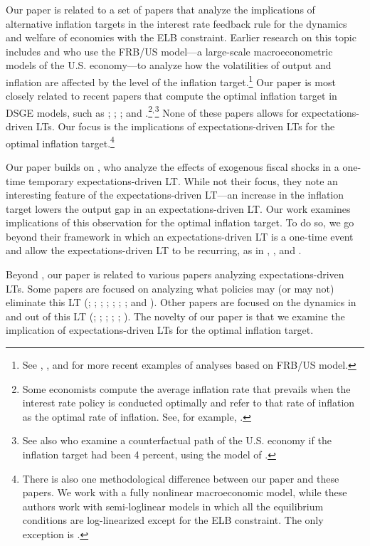 \documentclass[11pt]{article}
\begin{document}
	Our paper is related to a set of papers that analyze the implications of alternative inflation targets in the interest rate feedback rule for the dynamics and welfare of economies with the ELB constraint. Earlier research on this topic includes \citet{ReifschneiderWilliams2000} and \citet{CoenenOrphanidesWieland2004} who use the FRB/US model---a large-scale macroeconometric models of the U.S. economy---to analyze how the volatilities of output and inflation are affected by the level of the inflation target.\footnote{See \citet{Williams2009}, \citet{Tulip2014}, and \citet{KileyRoberts2017} for more recent examples of analyses based on FRB/US model.} Our paper is most closely related to recent papers that compute the optimal inflation target in DSGE models, such as \citet{CoibionGorodnichenkoWieland2012}; \citet{Blanco2018}; \citet{CarrerasCoibionGorodnichenkoWieland2016}; and \citet{AndradeGaliLeBihanMatheron2018}.\footnote{Some economists compute the average inflation rate that prevails when the interest rate policy is conducted optimally and refer to that rate of inflation as the optimal rate of inflation. See, for example, \citet{Billi2011}.}$^{,}$\footnote{See also \citet{AruobaSchorfheide2015} who examine a counterfactual path of the U.S. economy if the inflation target had been 4 percent, using the model of \citet{AruobaCubaBordaSchorfheide2018}.} None of these papers allows for expectations-driven LTs. Our focus is the implications of expectations-driven LTs for the optimal inflation target.\footnote{There is also one methodological difference between our paper and these papers. We work with a fully nonlinear macroeconomic model, while these authors work with semi-loglinear models in which all the equilibrium conditions are log-linearized except for the ELB constraint. The only exception is \citet{Blanco2018}.}

	Our paper builds on \citet{MertensRavn2014}, who analyze the effects of exogenous fiscal shocks in a one-time temporary expectations-driven LT. While not their focus, they note an interesting feature of the expectations-driven LT---an increase in the inflation target lowers the output gap in an expectations-driven LT. Our work examines implications of this observation for the optimal inflation target. To do so, we go beyond their framework in which an expectations-driven LT is a one-time event and allow the expectations-driven LT to be recurring, as in \citet{AruobaCubaBordaSchorfheide2018}, \citet{NakataSchmidt2019}, and \citet{Tamanyu2019}.

	Beyond \citet{MertensRavn2014}, our paper is related to various papers analyzing expectations-driven LTs. Some papers are focused on analyzing what policies may (or may not) eliminate this LT (\citet{AlstadheimHenderson2006}; \citet{Armenter2017}; \citet{BenhabibSchmittGroheUribe2002}; \citet{Schmidt2016}; \citet{SchmittGroheUribe2014}; \citet{SugoUeda2014}; \citet{NakataSchmidt2019}; and \citet{Tamanyu2019}). Other papers are focused on the dynamics in and out of this LT (\citet{AruobaCubaBordaSchorfheide2018}; \citet{Bilbiie2018}; \citet{CubaBordaSingh2018}; \citet{Hirose2007}; \citet{HiroseForthcoming}; \citet{SchmittGroheUribe2017}). The novelty of our paper is that we examine the implication of expectations-driven LTs for the optimal inflation target.
\end{document}

